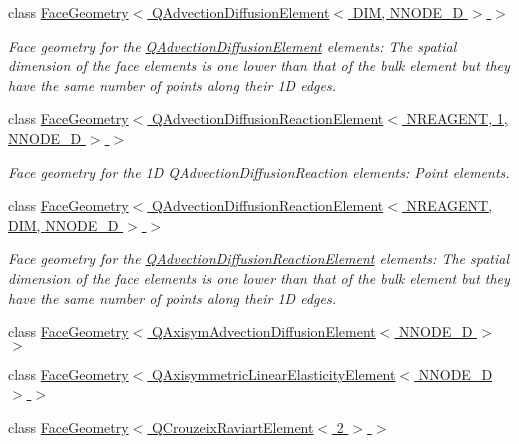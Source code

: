 \begin{DoxyCompactItemize}
class \hyperlink{classoomph_1_1FaceGeometry_3_01QAdvectionDiffusionElement_3_01DIM_00_01NNODE__1D_01_4_01_4}{Face\+Geometry$<$ Q\+Advection\+Diffusion\+Element$<$ D\+I\+M, N\+N\+O\+D\+E\+\_\+D $>$ $>$}
\begin{DoxyCompactList}\small\item\em Face geometry for the \hyperlink{classoomph_1_1QAdvectionDiffusionElement}{Q\+Advection\+Diffusion\+Element} elements\+: The spatial dimension of the face elements is one lower than that of the bulk element but they have the same number of points along their 1D edges. \end{DoxyCompactList}\item 
class \hyperlink{classoomph_1_1FaceGeometry_3_01QAdvectionDiffusionReactionElement_3_01NREAGENT_00_011_00_01NNODE__1D_01_4_01_4}{Face\+Geometry$<$ Q\+Advection\+Diffusion\+Reaction\+Element$<$ N\+R\+E\+A\+G\+E\+N\+T, 1, N\+N\+O\+D\+E\+\_\+D $>$ $>$}
\begin{DoxyCompactList}\small\item\em Face geometry for the 1D Q\+Advection\+Diffusion\+Reaction elements\+: Point elements. \end{DoxyCompactList}\item 
class \hyperlink{classoomph_1_1FaceGeometry_3_01QAdvectionDiffusionReactionElement_3_01NREAGENT_00_01DIM_00_01NNODE__1D_01_4_01_4}{Face\+Geometry$<$ Q\+Advection\+Diffusion\+Reaction\+Element$<$ N\+R\+E\+A\+G\+E\+N\+T, D\+I\+M, N\+N\+O\+D\+E\+\_\+D $>$ $>$}
\begin{DoxyCompactList}\small\item\em Face geometry for the \hyperlink{classoomph_1_1QAdvectionDiffusionReactionElement}{Q\+Advection\+Diffusion\+Reaction\+Element} elements\+: The spatial dimension of the face elements is one lower than that of the bulk element but they have the same number of points along their 1D edges. \end{DoxyCompactList}\item 
class \hyperlink{classoomph_1_1FaceGeometry_3_01QAxisymAdvectionDiffusionElement_3_01NNODE__1D_01_4_01_4}{Face\+Geometry$<$ Q\+Axisym\+Advection\+Diffusion\+Element$<$ N\+N\+O\+D\+E\+\_\+D $>$ $>$}
\item 
class \hyperlink{classoomph_1_1FaceGeometry_3_01QAxisymmetricLinearElasticityElement_3_01NNODE__1D_01_4_01_4}{Face\+Geometry$<$ Q\+Axisymmetric\+Linear\+Elasticity\+Element$<$ N\+N\+O\+D\+E\+\_\+D $>$ $>$}
\item 
class \hyperlink{classoomph_1_1FaceGeometry_3_01QCrouzeixRaviartElement_3_012_01_4_01_4}{Face\+Geometry$<$ Q\+Crouzeix\+Raviart\+Element$<$ 2 $>$ $>$}

\end{DoxyCompactItemize}
